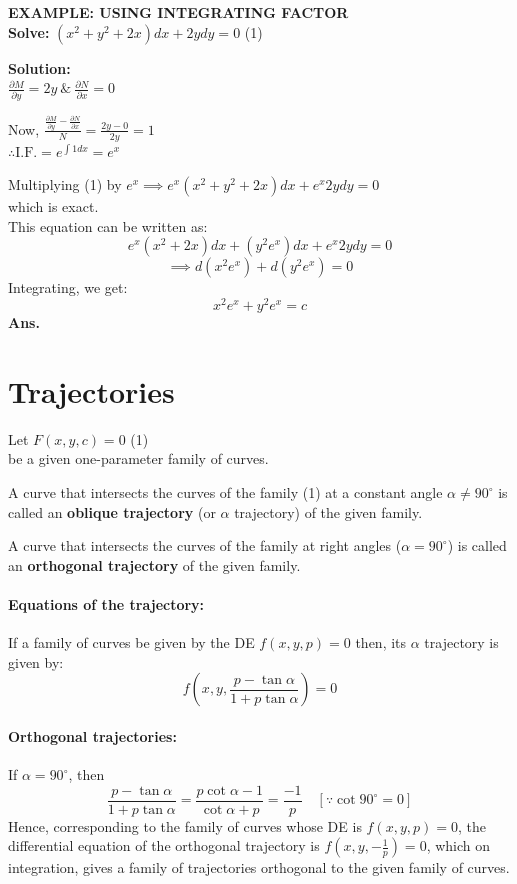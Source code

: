 \documentclass[11pt,a4paper]{article}
\begin{document}
\begin{tcolorbox}[colback=LightBg, colframe=BorderGray, arc=4mm]
    {\small\textbf{\textcolor{AccentBlue}{EXAMPLE: USING INTEGRATING FACTOR}}}
    \vspace{0.2cm}\\
    \textbf{Solve:} $\displaystyle (x^2+y^2+2x)dx + 2y dy = 0$ \hfill (1)
    
    \vspace{0.2cm}
    \textbf{Solution:} \\
    $\displaystyle \frac{\partial M}{\partial y} = 2y \ \& \ \frac{\partial N}{\partial x} = 0$
    
    Now, $\displaystyle \frac{\frac{\partial M}{\partial y} - \frac{\partial N}{\partial x}}{N} = \frac{2y - 0}{2y} = 1$ \\
    $\displaystyle \therefore \text{I.F.} = e^{\int 1 dx} = e^x$

    Multiplying (1) by $e^x \implies e^x(x^2+y^2+2x)dx + e^x 2y dy = 0$ \\
    which is exact. \\
    This equation can be written as:
    \[ e^x(x^2+2x)dx + (y^2 e^x)dx + e^x 2y dy = 0 \]
    \[ \implies d(x^2 e^x) + d(y^2 e^x) = 0 \]
    Integrating, we get:
    \[ x^2 e^x + y^2 e^x = c \]
    \textbf{Ans.}
\end{tcolorbox}

\section{Trajectories}
Let $F(x,y,c) = 0$ \hfill (1) \\
be a given one-parameter family of curves.

A curve that intersects the curves of the family (1) at a constant angle $\alpha \neq 90^\circ$ is called an \textbf{oblique trajectory} (or $\alpha$ trajectory) of the given family.

A curve that intersects the curves of the family at right angles ($\alpha = 90^\circ$) is called an \textbf{orthogonal trajectory} of the given family.

\paragraph{Equations of the trajectory:}
If a family of curves be given by the DE $f(x,y,p) = 0$ then, its $\alpha$ trajectory is given by:
\[ f\left(x, y, \frac{p - \tan \alpha}{1 + p \tan \alpha}\right) = 0 \]

\paragraph{Orthogonal trajectories:}
If $\alpha = 90^\circ$, then
\[ \frac{p - \tan \alpha}{1 + p \tan \alpha} = \frac{p \cot \alpha - 1}{\cot \alpha + p} = \frac{-1}{p} \quad [\because \cot 90^\circ = 0] \]
Hence, corresponding to the family of curves whose DE is $f(x,y,p) = 0$, the differential equation of the orthogonal trajectory is $f\left(x,y,-\frac{1}{p}\right) = 0$, which on integration, gives a family of trajectories orthogonal to the given family of curves.
\end{document}
